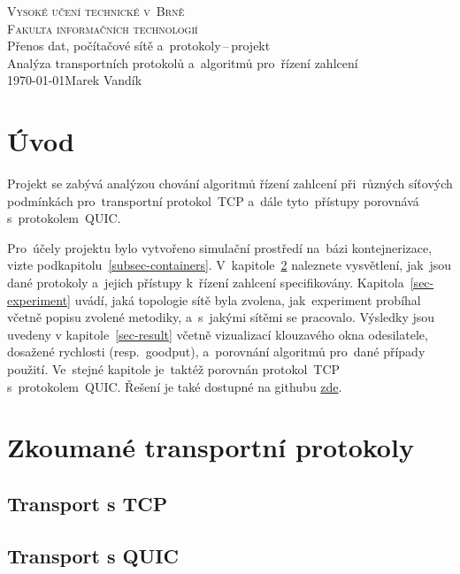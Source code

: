 \documentclass[a4paper,11pt]{article}
\begin{document}
\begin{titlepage}
\begin{center}
	\Huge{\textsc{Vysoké učení technické v~Brně}} \\
	\huge{\textsc{Fakulta informačních technologií}} \\
		\LARGE{Přenos dat, počítačové sítě a~protokoly\,--\,projekt} \\
		\Huge{Analýza transportních protokolů a~algoritmů pro~řízení zahlcení} \\
	\Large{\today \hfill Marek Vandík}
\end{center}
\end{titlepage}

\tableofcontents
\newpage

\section{Úvod}
Projekt se zabývá analýzou chování algoritmů řízení zahlcení při~různých síťových podmínkách pro~transportní
protokol~TCP a~dále tyto~přístupy porovnává s~protokolem~QUIC.

Pro~účely projektu bylo vytvořeno simulační prostředí na~bázi
kontejnerizace, vizte podkapitolu~\ref{subsec-containers}. %
V~kapitole~\ref{sec-transport} naleznete vysvětlení, jak~jsou dané protokoly a~jejich přístupy k~řízení zahlcení specifikovány.
Kapitola~\ref{sec-experiment} uvádí, jaká topologie sítě byla zvolena, jak~experiment probíhal včetně popisu zvolené metodiky, a~s~jakými sítěmi se pracovalo.
Výsledky jsou uvedeny v kapitole~\ref{sec-result} včetně vizualizací klouzavého okna odesilatele, dosažené rychlosti (resp.~goodput),
a~porovnání algoritmů pro~dané případy použití. Ve~stejné kapitole je~taktéž porovnán protokol~TCP s~protokolem~QUIC.
Řešení je také dostupné na githubu \href{https://github.com/marekVandik/PDS-projekt.git}{zde}.

\section{Zkoumané transportní protokoly} \label{sec-transport}
\subsection{Transport s TCP}
\subsection{Transport s QUIC}
\end{document}
